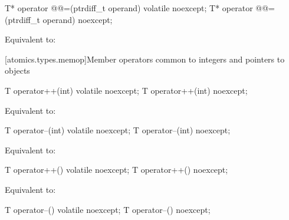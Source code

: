 %
%
\begin{itemdecl}
T* operator @@=(ptrdiff_t operand) volatile noexcept;
T* operator @@=(ptrdiff_t operand) noexcept;
\end{itemdecl}

\begin{itemdescr}
\pnum
\effects Equivalent to: 
\end{itemdescr}

[atomics.types.memop]{Member operators common to integers and pointers to objects}

%
%
\begin{itemdecl}
T operator++(int) volatile noexcept;
T operator++(int) noexcept;
\end{itemdecl}

\begin{itemdescr}
\effects Equivalent to: 
\end{itemdescr}

%
%
\begin{itemdecl}
T operator--(int) volatile noexcept;
T operator--(int) noexcept;
\end{itemdecl}

\begin{itemdescr}
\effects Equivalent to: 
\end{itemdescr}

%
%
\begin{itemdecl}
T operator++() volatile noexcept;
T operator++() noexcept;
\end{itemdecl}

\begin{itemdescr}
\pnum
\effects Equivalent to: 
\end{itemdescr}

%
%
\begin{itemdecl}
T operator--() volatile noexcept;
T operator--() noexcept;
\end{itemdecl}

